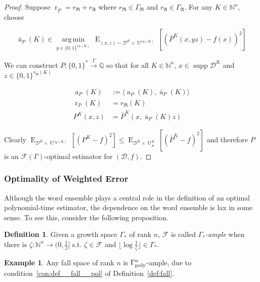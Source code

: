 \documentclass{article}
\numberwithin{equation}{section}
\theoremstyle{definition}
\newtheorem{definition}{Definition}[section]
\newtheorem{example}{Example}[section]
\theoremstyle{plain}
\newcommand{\Bool}{\{0,1\}}
\newcommand{\Words}{{\Bool^*}}
\newcommand{\WordsLen}[1]{{\Bool^{#1}}}
\DeclareMathOperator{\Supp}{supp}
\DeclareMathOperator{\E}{E}
\DeclareMathOperator{\R}{r}
\DeclareMathOperator{\A}{a}
\DeclareMathOperator{\Un}{U}
\newcommand{\Argmin}[1]{\underset{#1}{\operatorname{arg\,min}}\,}
\newcommand{\Nats}{\mathbb{N}}
\newcommand{\Rats}{\mathbb{Q}}
\newcommand{\NatFun}{\Nats^n \rightarrow}
\newcommand{\Floor}[1]{\lfloor #1 \rfloor}
\newcommand{\Chev}[1]{\langle #1 \rangle}
\newcommand{\Dist}{\mathcal{D}}
\newcommand{\GrowR}{\Gamma_{\mathfrak{R}}}
\newcommand{\GrowA}{\Gamma_{\mathfrak{A}}}
\newcommand{\Fall}{\mathcal{F}}
\newcommand{\EG}{\Fall(\Gamma)}
\newcommand{\GammaPoly}{\Gamma_{\textnormal{poly}}}
\newcommand{\Scheme}{\xrightarrow{\Gamma}}
\begin{document}
\begin{proof}

Suppose $\R_{\bar{P}}=r_{\mathfrak{R}}+r_{\mathfrak{A}}$ where $r_{\mathfrak{R}} \in \GrowR$ and $r_{\mathfrak{A}} \in \GrowA$. For any ${K \in \Nats^n}$, choose 

\[\bar{\A}_P(K) \in \Argmin{y \in \WordsLen{r_{\mathfrak{A}}(K)}} \E_{(x,z) \sim \Dist^{K} \times \Un^{r_{\mathfrak{R}}(K)}}[(\bar{P}^{K}(x,yz) - f(x))^2]\]

We can construct $P: \Words \Scheme \Rats$ so that for all $K \in \Nats^n$, $x \in \Supp \Dist^{K}$ and ${z \in \WordsLen{r_{\mathfrak{R}}(K)}}$

\begin{align*}
\A_P(K) &:=\Chev{\A_{\bar{P}}(K),\bar{\A}_P(K)} \\
\R_P(K) &= r_{\mathfrak{R}}(K) \\
P^{K}(x,z) &=\bar{P}^{K}(x,\bar{\A}_P(K)z)
\end{align*}

Clearly ${\E_{\Dist^{K} \times \Un^{r_{\mathfrak{R}}(K)}}[(P^{K} - f)^2] \leq \E_{\Dist^{K} \times \Un_{\bar{P}}^{K}}[(\bar{P}^{K} - f)^2]}$ and therefore $P$ is an $\EG$-optimal estimator for $(\Dist,f)$.
\end{proof}

\subsubsection{Optimality of Weighted Error}

Although the word ensemble plays a central role in the definition of an optimal polynomial-time estimator, the dependence on the word ensemble is lax in some sense. To see this, consider the following proposition.

\begin{definition}

Given a growth space $\Gamma_*$ of rank $n$, $\Fall$ is called \emph{$\Gamma_*$-ample} when there is $\zeta: \NatFun (0,\frac{1}{2}]$ s.t.  $\zeta \in \Fall$ and $\Floor{\log \frac{1}{\zeta}} \in \Gamma_*$.

\end{definition}

\begin{samepage}
\begin{example}

Any fall space of rank ${n}$ is ${\GammaPoly^n}$-ample, due to condition~\ref{con:def__fall__pol} of Definition~\ref{def:fall}.

\end{example}
\end{samepage}
\end{document}
